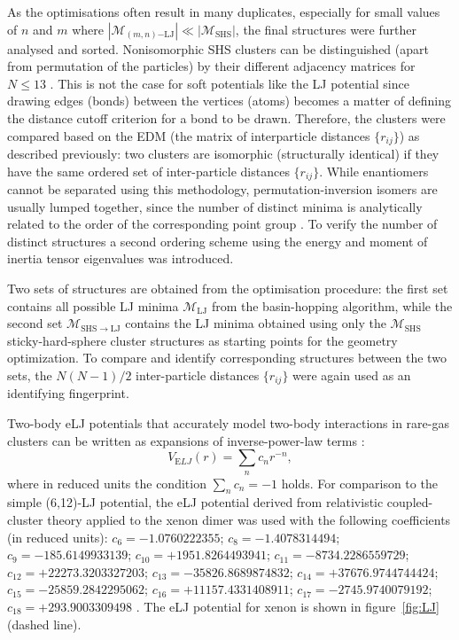 As the optimisations often result in many duplicates, especially for small
values of $n$ and $m$ where $|\mathcal{M}_{(m,n)\mathrm{-LJ}}| \ll
|\mathcal{M}_\mathrm{SHS}|$, the final structures were further analysed and
sorted. Nonisomorphic \ac{SHS} clusters can be distinguished (apart from
permutation of the particles) by their different adjacency matrices for $N \leq
13$ \autocite{Holmes-Cerfon_EnumeratingRigidSphere_2016}.  This is not the case
for soft potentials like the \ac{LJ} potential since drawing edges (bonds) between
the vertices (atoms) becomes a matter of defining the distance cutoff criterion
for a bond to be drawn. Therefore, the clusters were compared based on the
\ac{EDM} (the matrix of interparticle distances $\{r_{ij}\}$) as described
previously: two clusters are isomorphic (structurally identical) if they have
the same ordered set of inter-particle distances $\{r_{ij}\}$.  While
enantiomers cannot be separated using this methodology, permutation-inversion
isomers are usually lumped together, since the number of distinct minima is
analytically related to the order of the corresponding point group
\autocite{Wales_Energylandscapes_2003}.  To verify the number of distinct
structures a second ordering scheme using the energy and moment of inertia
tensor eigenvalues was introduced. 

Two sets of structures are obtained from the optimisation procedure: the first
set contains all possible \ac{LJ} minima $\mathcal{M}_\mathrm{LJ}$ from the
basin-hopping algorithm, while the second set $\mathcal{M}_\mathrm{SHS\to LJ}$
contains the \ac{LJ} minima obtained using only the $\mathcal{M}_\mathrm{SHS}$
sticky-hard-sphere cluster structures as starting points for the geometry
optimization.  To compare and identify corresponding structures between the two
sets, the $N(N-1)/2$ inter-particle distances $\{r_{ij}\}$ were again used as
an identifying fingerprint.

Two-body \ac{eLJ} potentials that accurately model
two-body interactions in rare-gas clusters can be written as expansions of
inverse-power-law terms
\autocite{Schwerdtfeger_ExtensionLennardJonespotential_2006}:
%
\begin{equation} \label{eq:ELJ}
V_{\mathrm ELJ}(r)=\sum_{n} c_nr^{-n},
\end{equation}
%
where in reduced units the condition $\sum_{n} c_n=-1$ holds. For comparison
to the simple (6,12)-\ac{LJ} potential, the \ac{eLJ} potential derived from
relativistic coupled-cluster theory applied to the xenon dimer was used with the
following coefficients (in reduced units):
$c_6=-1.0760222355$; $c_8=-1.4078314494$; $c_9=-185.6149933139$;
$c_{10}=+1951.8264493941$; $c_{11}=-8734.2286559729$;
$c_{12}=+22273.3203327203$; $c_{13}=-35826.8689874832$;
$c_{14}=+37676.9744744424$; $c_{15}=-25859.2842295062$;
$c_{16}=+11157.4331408911$; $c_{17}=-2745.9740079192$; $c_{18}=+293.9003309498$
\autocite{Jerabek_relativisticcoupledclusterinteraction_2017}. The \ac{eLJ}
potential for xenon is shown in figure~\ref{fig:LJ} (dashed line).


